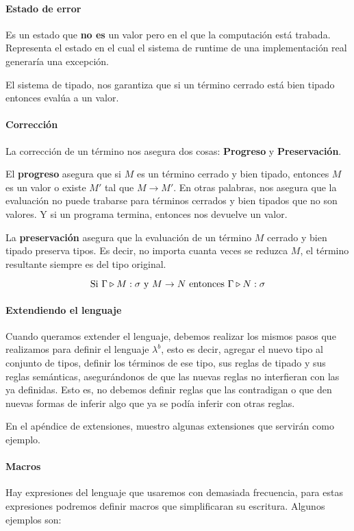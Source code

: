 \paragraph{Estado de error} Es un estado que \textbf{no es} un valor pero en el que la computación está trabada. Representa el estado en el cual el sistema de runtime de una implementación real generaría una excepción.

El sistema de tipado, nos garantiza que si un término cerrado está bien tipado entonces evalúa a un valor.


 \paragraph{Corrección}
La corrección de un término nos asegura dos cosas:	\textbf{Progreso} y \textbf{Preservación}.

El \textbf{progreso} asegura que si $M$ es un término cerrado y bien tipado, entonces $M$ es un valor o existe $M'$ tal que $M\to M'$. En otras palabras, nos asegura que la evaluación no puede trabarse para términos cerrados y bien tipados que no son valores. Y si un programa termina, entonces nos devuelve un valor.

La \textbf{preservación} asegura que la evaluación de un término $M$ cerrado y bien tipado preserva tipos. Es decir, no importa cuanta veces se reduzca $M$, el término resultante siempre es del tipo original.

$$\text{Si } \Gamma\triangleright M : \sigma \text{ y } M\to N \text{ entonces } \Gamma\triangleright N : \sigma$$	

\paragraph{Extendiendo el lenguaje}
Cuando queramos extender el lenguaje, debemos realizar los mismos pasos que realizamos para definir el lenguaje $\lambda^b$, esto es decir, agregar el nuevo tipo al conjunto de tipos, definir los términos de ese tipo, sus reglas de tipado y sus reglas semánticas, asegurándonos de que las nuevas reglas no interfieran con las ya definidas. Esto es, no debemos definir reglas que las contradigan o que den nuevas formas de inferir algo que ya se podía inferir con otras reglas.

En el apéndice de extensiones, muestro algunas extensiones que servirán como ejemplo.


\paragraph{Macros} Hay expresiones del lenguaje que usaremos con demasiada frecuencia, para estas expresiones podremos definir macros que simplificaran su escritura. Algunos ejemplos son:

